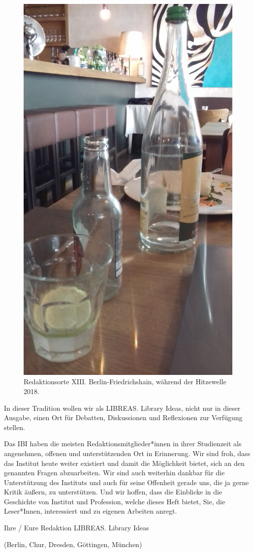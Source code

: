 \documentclass[a4paper,
fontsize=11pt,
oneside,
numbers=noperiodatend,
parskip=half-,
bibliography=totoc,
final
]{scrartcl}
\begin{document}
\begin{figure}
\centering
\includegraphics{image.jpg}
\caption{Redaktionsorte XIII. Berlin-Friedrichshain, während der
Hitzewelle 2018.}
\end{figure}

In dieser Tradition wollen wir als LIBREAS. Library Ideas, nicht nur in
dieser Ausgabe, einen Ort für Debatten, Diskussionen und Reflexionen zur
Verfügung stellen.

Das IBI haben die meisten Redaktionsmitglieder*innen in ihrer
Studienzeit als angenehmen, offenen und unterstützenden Ort in
Erinnerung. Wir sind froh, dass das Institut heute weiter existiert und
damit die Möglichkeit bietet, sich an den genannten Fragen abzuarbeiten.
Wir sind auch weiterhin dankbar für die Unterstützung des Instituts und
auch für seine Offenheit gerade uns, die ja gerne Kritik äußern, zu
unterstützen. Und wir hoffen, dass die Einblicke in die Geschichte von
Institut und Profession, welche dieses Heft bietet, Sie, die
Leser*Innen, interessiert und zu eigenen Arbeiten anregt.

Ihre / Eure Redaktion LIBREAS. Library Ideas

(Berlin, Chur, Dresden, Göttingen, München)

\end{document}
